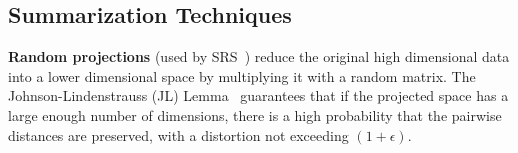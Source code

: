 \subsection{Summarization Techniques}

\noindent\textbf{Random projections} (used by SRS~\cite{conf/vldb/sun14}) reduce the original high dimensional data into a lower dimensional space by multiplying it with a random matrix. 
The Johnson-Lindenstrauss (JL) Lemma~\cite{conf/map/johnson84} guarantees that if the projected space has a large enough number of dimensions, there is a high probability that the pairwise distances are preserved, with a distortion not exceeding $(1+\epsilon)$.





